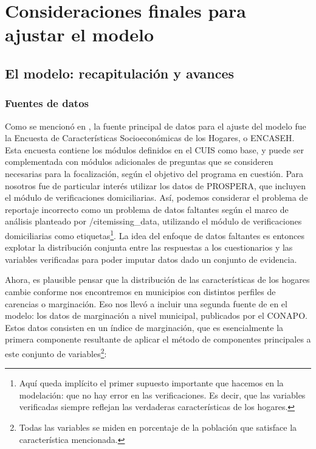 \chapter{Consideraciones finales para ajustar el modelo}
\label{chap:ajuste}
\section*{El modelo: recapitulación y avances}
\subsection*{Fuentes de datos}
Como se mencionó en \cite{mzl_entregable_2}, la fuente principal de datos para el ajuste del modelo fue la Encuesta de Características Socioeconómicas de los Hogares, o ENCASEH. Esta encuesta contiene los módulos definidos en el CUIS como base, y puede ser complementada con módulos adicionales de preguntas que se consideren necesarias para la focalización, según el objetivo del programa en cuestión. Para nosotros fue de particular interés utilizar los datos de PROSPERA, que incluyen el módulo de verificaciones domiciliarias. Así, podemos considerar el problema de reportaje incorrecto como un problema de datos faltantes según el marco de análisis planteado por /cite{missing_data}, utilizando el módulo de verificaciones domiciliarias como etiquetas\footnote{Aquí queda implícito el primer supuesto importante que hacemos en la modelación: que no hay error en las verificaciones. Es decir, que las variables verificadas siempre reflejan las verdaderas características de los hogares.}. La idea del enfoque de datos faltantes es entonces explotar la distribución conjunta entre las respuestas a los cuestionarios y las variables verificadas para poder imputar datos dado un conjunto de evidencia.
\par
\noindent
Ahora, es plausible pensar que la distribución de las características de los hogares cambie conforme nos encontremos en municipios con distintos perfiles de carencias o marginación. Eso nos llevó a incluir una segunda fuente de en el modelo: los datos de marginación a nivel municipal, publicados por el CONAPO. Estos datos consisten en un índice de marginación, que es esencialmente la primera componente resultante de aplicar el método de componentes principales a este conjunto de variables\footnote{Todas las variables se miden en porcentaje de la población que satisface la característica mencionada.}:
